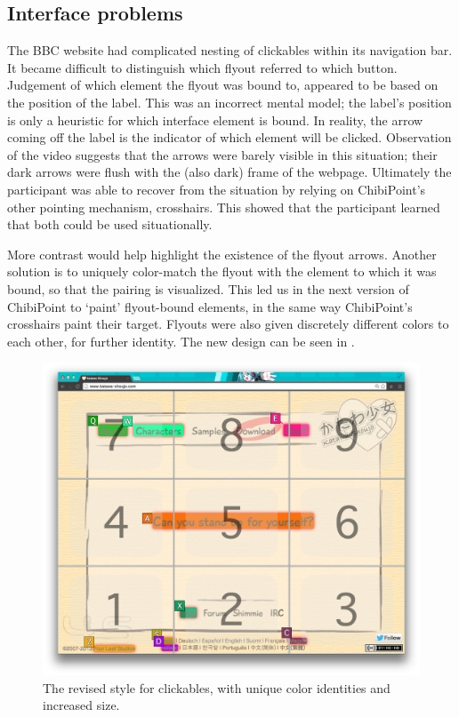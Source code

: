 \documentclass[11pt,openright,a4paper]{report}
\begin{document}
\subsection{Interface problems}
The BBC website had complicated nesting of clickables within its navigation bar. It became difficult to distinguish which flyout referred to which button. Judgement of which element the flyout was bound to, appeared to be based on the position of the label. This was an incorrect mental model; the label's position is only a heuristic for which interface element is bound. In reality, the arrow coming off the label is the indicator of which element will be clicked. Observation of the video suggests that the arrows were barely visible in this situation; their dark arrows were flush with the (also dark) frame of the webpage. Ultimately the participant was able to recover from the situation by relying on ChibiPoint's other pointing mechanism, crosshairs. This showed that the participant learned that both could be used situationally.

More contrast would help highlight the existence of the flyout arrows. Another solution is to uniquely color-match the flyout with the element to which it was bound, so that the pairing is visualized. This led us in the next version of ChibiPoint to `paint' flyout-bound elements, in the same way ChibiPoint's crosshairs paint their target. Flyouts were also given discretely different colors to each other, for further identity. The new design can be seen in .

\begin{figure}[ht]
\centering\includegraphics[width=\textwidth]{figures/ImpClickables.png}
\caption{The revised style for clickables, with unique color identities and increased size.}
\label{fig:impClickable}
\end{figure}
\end{document}
